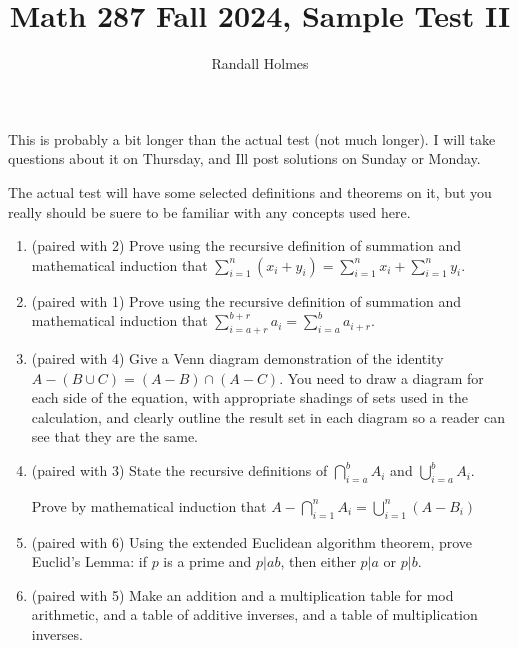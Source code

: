 \documentclass[12pt]{article}
\title{Math 287 Fall 2024, Sample Test II}
\author{Randall Holmes}
\begin{document}
\maketitle

This is probably a bit longer than the actual test (not much longer).  I will take questions about it on Thursday, and Ill post solutions on Sunday or Monday.

The actual test will have some selected definitions and theorems on it, but you really should be suere to be familiar with any concepts used here.

\begin{enumerate}

\item  (paired with 2)  Prove using the recursive definition of summation and mathematical induction that $\sum_{i=1}^n (x_i + y_i) = \sum_{i=1}^n x_i + \sum_{i=1}^n y_i$.

\newpage

\item (paired with 1)  Prove using the recursive definition of summation and mathematical induction that $\sum_{i=a+r}^{b+r}a_i = \sum_{i=a}^b a_{i+r}$.

\newpage

\item  (paired with 4) Give a Venn diagram demonstration of the identity $A - (B \cup C) = (A-B) \cap (A-C)$.  You need to draw a diagram for each side of the equation, with appropriate shadings of sets used in the calculation, and clearly outline the result set in each diagram so a reader can see that they are the same.

\newpage

\item  (paired with 3) State the recursive definitions of $\bigcap_{i=a}^b A_i$ and $\bigcup_{i=a}^b A_i$.

Prove by mathematical induction that $A - \bigcap_{i=1}^n A_i = \bigcup_{i=1}^n (A - B_i)$

\newpage

\item  (paired with 6)  Using the extended Euclidean algorithm theorem, prove Euclid's Lemma:  if $p$ is a prime and $p|ab$, then either $p|a$ or $p|b$.

\newpage

\item  (paired with 5) Make an addition and a multiplication table for mod arithmetic, and a table of additive inverses, and a table of multiplication inverses.


\end{enumerate}
\end{document}
